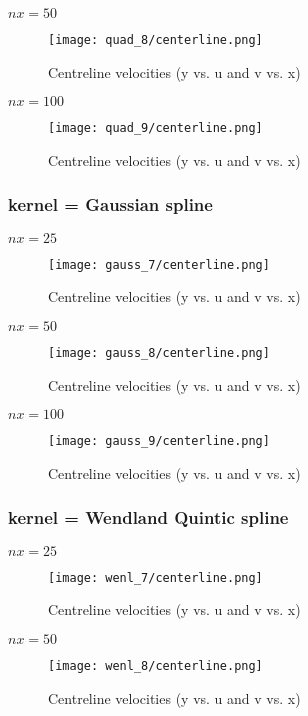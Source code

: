 \documentclass{article}
\begin{document}
\newpage
$nx = 50 $
\\
\begin{figure}[H]   \label{figure}
\texttt{[image: quad\_8/centerline.png]}
\caption{Centreline velocities (y vs. u and v vs. x)}
\label{figure:}
\end{figure}
\newpage

$nx = 100 $
\\
\begin{figure}[H]   \label{figure}
\texttt{[image: quad\_9/centerline.png]}
\caption{Centreline velocities (y vs. u and v vs. x)}
\label{figure:}
\end{figure}

\newpage
\subsubsection{kernel = Gaussian spline}
$nx = 25 $
\\
\begin{figure}[H]   \label{figure}
\texttt{[image: gauss\_7/centerline.png]}
\caption{Centreline velocities (y vs. u and v vs. x)}
\label{figure:}
\end{figure}

\newpage
$nx = 50 $
\\
\begin{figure}[H]   \label{figure}
\texttt{[image: gauss\_8/centerline.png]}
\caption{Centreline velocities (y vs. u and v vs. x)}
\label{figure:}
\end{figure}

\newpage
$nx = 100 $
\\
\begin{figure}[H]   \label{figure}
\texttt{[image: gauss\_9/centerline.png]}
\caption{Centreline velocities (y vs. u and v vs. x)}
\label{figure:}
\end{figure}

\newpage
\subsubsection{kernel = Wendland Quintic spline}
$nx = 25 $
\\
\begin{figure}[H]   \label{figure}
\texttt{[image: wenl\_7/centerline.png]}
\caption{Centreline velocities (y vs. u and v vs. x)}
\label{figure:}
\end{figure}

\newpage
$nx = 50 $
\\
\begin{figure}[H]   \label{figure}
\texttt{[image: wenl\_8/centerline.png]}
\caption{Centreline velocities (y vs. u and v vs. x)}
\label{figure:}
\end{figure}
\end{document}
